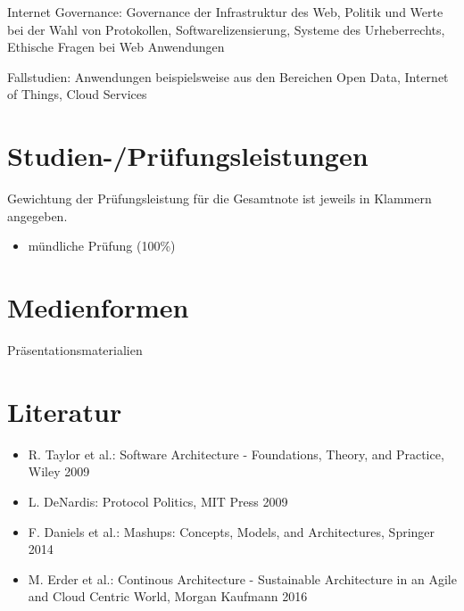 Internet Governance: Governance der Infrastruktur des Web, Politik und
Werte bei der Wahl von Protokollen, Softwarelizensierung, Systeme des
Urheberrechts, Ethische Fragen bei Web Anwendungen

Fallstudien: Anwendungen beispielsweise aus den Bereichen Open Data,
Internet of Things, Cloud Services

\section*{Studien-/Prüfungsleistungen\label{/mi-2017/modulbeschreibungen-master/MA_WTW_Modul_Web-Architekturen}}\label{studien-pruxfcfungsleistungenpathlabelmi-2017modulbeschreibungen-mastermaux5fwtwux5fmodulux5fweb-architekturen}

Gewichtung der Prüfungsleistung für die Gesamtnote ist jeweils in
Klammern angegeben.

\begin{itemize}
\tightlist
\item
  mündliche Prüfung (100\%)
\end{itemize}

\section*{Medienformen\label{/mi-2017/modulbeschreibungen-master/MA_WTW_Modul_Web-Architekturen}}\label{medienformenpathlabelmi-2017modulbeschreibungen-mastermaux5fwtwux5fmodulux5fweb-architekturen}

Präsentationsmaterialien

\section*{Literatur\label{/mi-2017/modulbeschreibungen-master/MA_WTW_Modul_Web-Architekturen}}\label{literaturpathlabelmi-2017modulbeschreibungen-mastermaux5fwtwux5fmodulux5fweb-architekturen}

\begin{itemize}
\tightlist
\item
  R. Taylor et al.: Software Architecture - Foundations, Theory, and
  Practice, Wiley 2009
\item
  L. DeNardis: Protocol Politics, MIT Press 2009
\item
  F. Daniels et al.: Mashups: Concepts, Models, and Architectures,
  Springer 2014
\item
  M. Erder et al.: Continous Architecture - Sustainable Architecture in
  an Agile and Cloud Centric World, Morgan Kaufmann 2016
\end{itemize}

